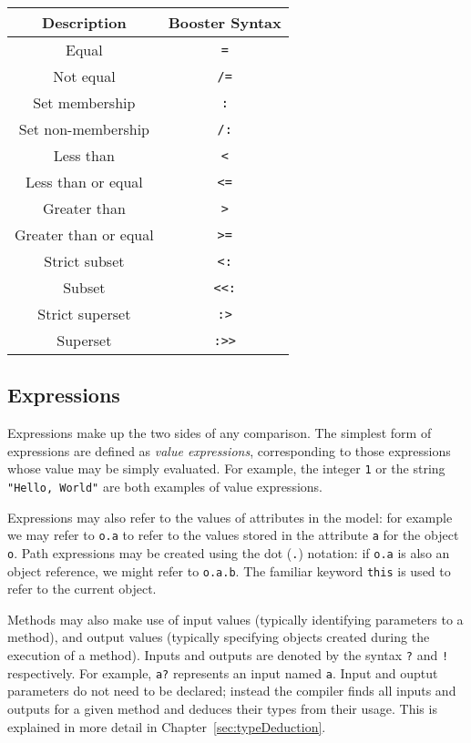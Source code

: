 \begin{center}
  \begin{tabular} { | c | c | } 
  \hline
  \textbf{Description} & \textbf{Booster Syntax} \\ \hline
  Equal & \verb|=| \\ \hline
  Not equal & \verb|/=| \\ \hline
  Set membership & \verb|:| \\ \hline
  Set non-membership & \verb|/:| \\ \hline
  Less than & \verb|<| \\ \hline
  Less than or equal & \verb|<=| \\ \hline
  Greater than & \verb|>| \\ \hline
  Greater than or equal & \verb|>=| \\ \hline
  Strict subset & \verb|<:| \\ \hline
  Subset & \verb|<<:| \\ \hline
  Strict superset & \verb|:>| \\ \hline
  Superset & \verb|:>>| \\ \hline
  \end{tabular}
\end{center}

\subsection{Expressions}

Expressions make up the two sides of any comparison.  The simplest
form of expressions are defined as \emph{value expressions},
corresponding to those expressions whose value may be simply
evaluated.  For example, the integer \verb|1| or the string
\verb|"Hello, World"| are both examples of value expressions.

Expressions may also refer to the values of attributes in the model:
for example we may refer to \verb|o.a| to
refer to the values stored in the attribute \verb|a| for the object
\verb|o|.  Path expressions may be created using the dot (\verb|.|)
notation: if \verb|o.a| is also an object reference, we might refer to
\verb|o.a.b|.  The familiar keyword \verb|this| is used to refer to
the current object.

Methods may also make use of input values (typically identifying
parameters to a method), and output values (typically specifying
objects created during the execution of a method).  Inputs and
outputs are denoted by the syntax \verb|?| and \verb|!| respectively.
For example, \verb|a?| represents an input named \verb|a|.  Input and
ouptut parameters do not need to be declared; instead the compiler
finds all inputs and outputs for a given method and deduces their
types from their usage.  This is explained in more detail in
Chapter~\ref{sec:typeDeduction}.

